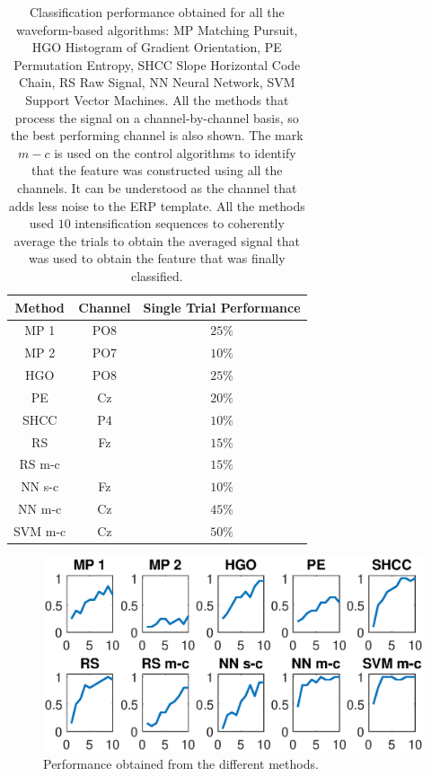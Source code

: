 \documentclass[sensors,article,submit,moreauthors,pdftex,10pt,a4paper]{mdpi}
\begin{document}
\begin{table}[H]
\caption{Classification performance obtained for all the waveform-based algorithms: MP Matching Pursuit, HGO Histogram of Gradient Orientation, PE Permutation Entropy, SHCC Slope Horizontal Code Chain, RS Raw Signal, NN Neural Network, SVM Support Vector Machines.  All the methods that process the signal on a channel-by-channel basis, so the best performing channel is also shown. The mark $m-c$ is used on the control algorithms to identify that the feature was constructed using all the channels.  It can be understood as the channel that adds less noise to the ERP template. All the methods used $10$ intensification sequences to coherently average the trials to obtain the averaged signal that was used to obtain the feature that was finally classified.}
\centering
\begin{tabular}{ccc}
\toprule
\textbf{Method}	& \textbf{Channel} & \textbf{Single Trial Performance}	\\
\midrule
MP 1 & PO8 & $25\%$ \\
MP 2 & PO7 & $10\%$ \\
HGO  & PO8 & $25\%$ \\
PE     & Cz & $20\%$ \\
SHCC & P4 & $10\%$ \\
RS     & Fz & $15\%$ \\
RS m-c &   & $15\%$ \\
NN s-c & Fz & $10\%$ \\
NN m-c & Cz & $45\%$ \\
SVM m-c & Cz & $50\%$ \\
\bottomrule
\end{tabular}
\label{tab:results}
\end{table}


\begin{figure}[H]
\centering
\includegraphics[width=15cm]{images/PerformanceTest.eps}
\caption{Performance obtained from the different methods.}
\label{fig:performancetest}
\end{figure}
\end{document}
